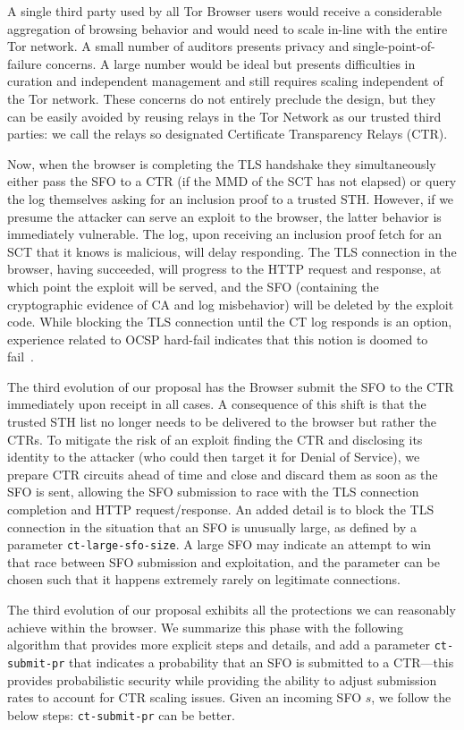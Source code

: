A single third party used by all Tor Browser users would receive a considerable
aggregation of browsing behavior and would need to scale in-line with the entire
Tor network. A small number of auditors presents privacy and
single-point-of-failure concerns. A large number would be ideal but presents
difficulties in curation and independent management and still requires scaling
independent of the Tor network. These concerns do not entirely preclude the
design, but they can be easily avoided by reusing relays in the Tor Network as
our trusted third parties: we call the relays so designated Certificate
Transparency Relays (CTR).

Now, when the browser is completing the TLS handshake they simultaneously either
pass the SFO to a CTR (if the MMD of the SCT has not elapsed) or query the log
themselves asking for an inclusion proof to a trusted STH\@.  However, if we
presume the attacker can serve an exploit to the browser, the latter behavior is
immediately vulnerable. The log, upon receiving an inclusion proof fetch for an
SCT that it knows is malicious, will delay responding. The TLS connection in the
browser, having succeeded, will progress to the HTTP request and response, at
which point the exploit will be served, and the SFO (containing the
cryptographic evidence of CA and log misbehavior) will be deleted by the exploit
code. While blocking the TLS connection until the CT log responds is an option,
experience related to OCSP hard-fail indicates that this notion is doomed to
fail~\cite{no-hard-fail}.

The third evolution of our proposal has the Browser submit the SFO to the CTR
immediately upon receipt in all cases. A consequence of this shift is that the
trusted STH list no longer needs to be delivered to the browser but rather the
CTRs. To mitigate the risk of an exploit finding the CTR and disclosing its
identity to the attacker (who could then target it for Denial of Service), we
prepare CTR circuits ahead of time and close and discard them as soon as the SFO
is sent, allowing the SFO submission to race with the TLS connection completion
and HTTP request/response.  An added detail is to block the TLS connection in
the situation that an SFO is unusually large, as defined by a parameter
\texttt{ct-large-sfo-size}. A large SFO may indicate an attempt to win that race
between SFO submission and exploitation, and the parameter can be chosen such
that it happens extremely rarely on legitimate connections.

The third evolution of our proposal exhibits all the protections we can
reasonably achieve within the browser. We summarize this phase with the
following algorithm that provides more explicit steps and details, and add a
parameter \texttt{ct-submit-pr} that indicates a probability that an SFO is
submitted to a CTR---this provides probabilistic security while providing the
ability to adjust submission rates to account for CTR scaling issues. Given an
incoming SFO $s$, we follow the below steps: %
\texttt{ct-submit-pr} can be better.

